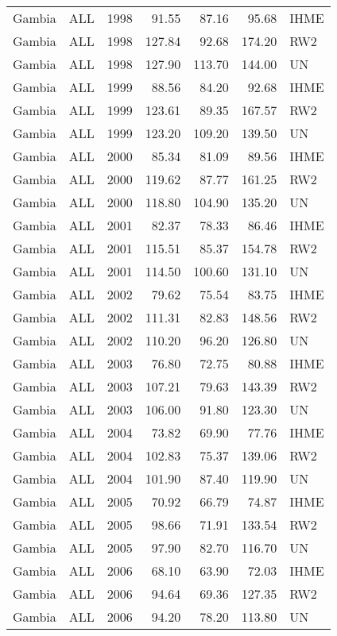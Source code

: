 \begin{longtable}{lllrrrl}
  Gambia & ALL & 1998 & 91.55 & 87.16 & 95.68 & IHME \\ 
  Gambia & ALL & 1998 & 127.84 & 92.68 & 174.20 & RW2 \\ 
  Gambia & ALL & 1998 & 127.90 & 113.70 & 144.00 & UN \\ 
  Gambia & ALL & 1999 & 88.56 & 84.20 & 92.68 & IHME \\ 
  Gambia & ALL & 1999 & 123.61 & 89.35 & 167.57 & RW2 \\ 
  Gambia & ALL & 1999 & 123.20 & 109.20 & 139.50 & UN \\ 
  Gambia & ALL & 2000 & 85.34 & 81.09 & 89.56 & IHME \\ 
  Gambia & ALL & 2000 & 119.62 & 87.77 & 161.25 & RW2 \\ 
  Gambia & ALL & 2000 & 118.80 & 104.90 & 135.20 & UN \\ 
  Gambia & ALL & 2001 & 82.37 & 78.33 & 86.46 & IHME \\ 
  Gambia & ALL & 2001 & 115.51 & 85.37 & 154.78 & RW2 \\ 
  Gambia & ALL & 2001 & 114.50 & 100.60 & 131.10 & UN \\ 
  Gambia & ALL & 2002 & 79.62 & 75.54 & 83.75 & IHME \\ 
  Gambia & ALL & 2002 & 111.31 & 82.83 & 148.56 & RW2 \\ 
  Gambia & ALL & 2002 & 110.20 & 96.20 & 126.80 & UN \\ 
  Gambia & ALL & 2003 & 76.80 & 72.75 & 80.88 & IHME \\ 
  Gambia & ALL & 2003 & 107.21 & 79.63 & 143.39 & RW2 \\ 
  Gambia & ALL & 2003 & 106.00 & 91.80 & 123.30 & UN \\ 
  Gambia & ALL & 2004 & 73.82 & 69.90 & 77.76 & IHME \\ 
  Gambia & ALL & 2004 & 102.83 & 75.37 & 139.06 & RW2 \\ 
  Gambia & ALL & 2004 & 101.90 & 87.40 & 119.90 & UN \\ 
  Gambia & ALL & 2005 & 70.92 & 66.79 & 74.87 & IHME \\ 
  Gambia & ALL & 2005 & 98.66 & 71.91 & 133.54 & RW2 \\ 
  Gambia & ALL & 2005 & 97.90 & 82.70 & 116.70 & UN \\ 
  Gambia & ALL & 2006 & 68.10 & 63.90 & 72.03 & IHME \\ 
  Gambia & ALL & 2006 & 94.64 & 69.36 & 127.35 & RW2 \\ 
  Gambia & ALL & 2006 & 94.20 & 78.20 & 113.80 & UN \\ 

\end{longtable}
